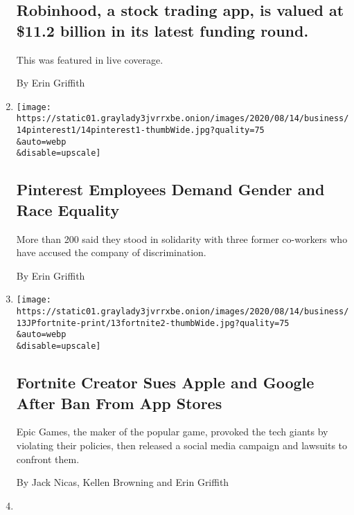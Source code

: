 \begin{enumerate}
{  \subsection{Robinhood, a stock trading app, is valued at \$11.2
  billion in its latest funding
  round.}\label{robinhood-a-stock-trading-app-is-valued-at-112-billion-in-its-latest-funding-round}}

  This was featured in live coverage.

  By Erin Griffith
\item
  \href{/2020/08/14/technology/pinterest-walkout-equality.html}{}

  \texttt{[image: https://static01.graylady3jvrrxbe.onion/images/2020/08/14/business/14pinterest1/14pinterest1-thumbWide.jpg?quality=75\\\&auto=webp\\\&disable=upscale]}

  \hypertarget{pinterest-employees-demand-gender-and-race-equality}{%
  \subsection{Pinterest Employees Demand Gender and Race
  Equality}\label{pinterest-employees-demand-gender-and-race-equality}}

  More than 200 said they stood in solidarity with three former
  co-workers who have accused the company of discrimination.

  By Erin Griffith
\item
  \href{/2020/08/13/technology/apple-fortnite-ban.html}{}

  \texttt{[image: https://static01.graylady3jvrrxbe.onion/images/2020/08/14/business/13JPfortnite-print/13fortnite2-thumbWide.jpg?quality=75\\\&auto=webp\\\&disable=upscale]}

  \hypertarget{fortnite-creator-sues-apple-and-google-after-ban-from-app-stores}{%
  \subsection{Fortnite Creator Sues Apple and Google After Ban From App
  Stores}\label{fortnite-creator-sues-apple-and-google-after-ban-from-app-stores}}

  Epic Games, the maker of the popular game, provoked the tech giants by
  violating their policies, then released a social media campaign and
  lawsuits to confront them.

  By Jack Nicas, Kellen Browning and Erin Griffith
\item
  \href{/2020/08/11/technology/pinterest-francoise-brougher-gender-discrimination-lawsuit.html}{}


\end{enumerate}
